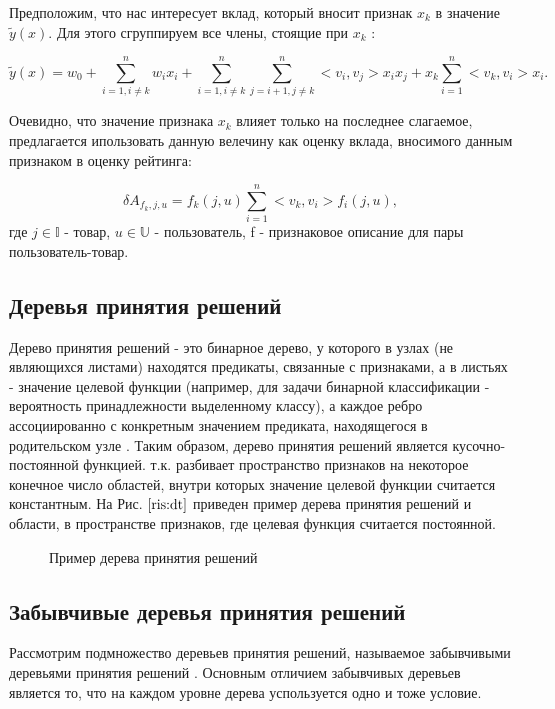 \documentclass[12pt,a4paper]{report}
\begin{document}
Предположим, что нас интересует вклад, который вносит признак $x_k$ в значение $\tilde{y}(x)$. Для этого сгруппируем все члены, стоящие при $x_k$ :

\begin{equation*}
\tilde{y}(x) = w_0 + \sum_{i=1, i \neq k}^{n}w_ix_i + \sum_{i=1, i \neq k}^{n}\sum_{j=i+1, j \neq k}^{n}<v_i, v_j>x_ix_j + x_k \sum_{i = 1}^{n}<v_k, v_i>x_i.
\end{equation*}

Очевидно, что значение признака $x_k$ влияет только на последнее слагаемое, предлагается ипользовать данную велечину как оценку вклада, вносимого данным признаком в оценку рейтинга:

\begin{equation*}
\delta A_{f_k, j, u} = f_k(j, u) \sum_{i = 1}^{n}<v_k, v_i>f_i(j, u),
\end{equation*}
где $j \in \mathbb{I}$ - товар, $u \in \mathbb{U}$ - пользователь, f - признаковое описание для пары пользователь-товар.


\subsection{Деревья принятия решений}
Дерево принятия решений - это бинарное дерево, у которого в узлах (не являющихся листами) находятся предикаты, связанные с признаками, а в листьях - значение целевой функции (например, для задачи бинарной классификации - вероятность принадлежности выделенному классу), а каждое ребро ассоциированно с конкретным значением предиката, находящегося в родительском узле \cite{Dt}.
Таким образом, дерево принятия решений является кусочно-постоянной функцией. т.к. разбивает пространство признаков на некоторое конечное число областей, внутри которых значение целевой функции считается константным. На Рис. $\ref{ris:dt}$ приведен пример дерева принятия решений и области, в пространстве признаков, где целевая функция считается постоянной.

\begin{figure}[H]
\center{\texttt{[image: dt]}}
\caption{Пример дерева принятия решений}
\label{ris:dt}
\end{figure}

\subsection{Забывчивые деревья принятия решений}
Рассмотрим подмножество деревьев принятия решений, называемое забывчивыми деревьями принятия решений \cite{Ot}.
Основным отличием забывчивых деревьев является то, что на каждом уровне дерева успользуется одно и тоже условие. 
\end{document}
